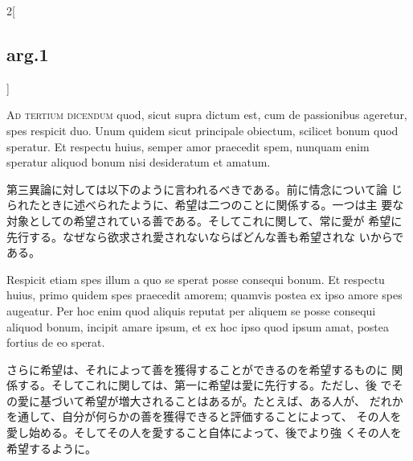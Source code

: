 \documentclass[paper=a4paper,fontsize=10pt,jafontsize=9pt,titlepage]{jlreq}
\begin{document}
\begin{paracol}{2}[\subsection{arg.1}]
\switchcolumn*[\subsection{ad.3}]

{\scshape Ad tertium dicendum} quod, sicut supra dictum est, cum de
passionibus ageretur, spes respicit duo. Unum quidem sicut principale
obiectum, scilicet bonum quod speratur. Et respectu huius, semper amor
praecedit spem, nunquam enim speratur aliquod bonum nisi desideratum
et amatum.

\switchcolumn

第三異論に対しては以下のように言われるべきである。前に情念について論
 じられたときに述べられたように、希望は二つのことに関係する。一つは主
 要な対象としての希望されている善である。そしてこれに関して、常に愛が
 希望に先行する。なぜなら欲求され愛されないならばどんな善も希望されな
 いからである。

\switchcolumn*

Respicit etiam spes illum a quo se sperat posse consequi
bonum. Et respectu huius, primo quidem spes praecedit amorem; quamvis
postea ex ipso amore spes augeatur. Per hoc enim quod aliquis reputat
per aliquem se posse consequi aliquod bonum, incipit amare ipsum, et
ex hoc ipso quod ipsum amat, postea fortius de eo sperat.

\switchcolumn

さらに希望は、それによって善を獲得することができるのを希望するものに
 関係する。そしてこれに関しては、第一に希望は愛に先行する。ただし、後
 でその愛に基づいて希望が増大されることはあるが。たとえば、ある人が、
 だれかを通して、自分が何らかの善を獲得できると評価することによって、
 その人を愛し始める。そしてその人を愛すること自体によって、後でより強
 くその人を希望するように。

\end{paracol}
\end{document}
